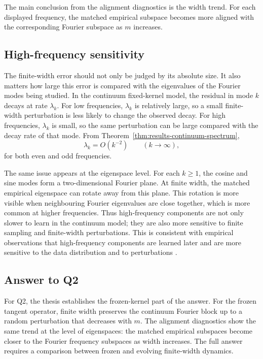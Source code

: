 The main conclusion from the alignment diagnostics is the width trend. For each
displayed frequency, the matched empirical subspace becomes more aligned with
the corresponding Fourier subspace as \(m\) increases.

\subsection{High-frequency sensitivity}
\label{subsec:discussion-q2-relative}

The finite-width error should not only be judged by its absolute size. It also
matters how large this error is compared with the eigenvalues of the Fourier
modes being studied. In the continuum fixed-kernel model, the residual in mode
\(k\) decays at rate \(\lambda_k\). For low frequencies, \(\lambda_k\) is
relatively large, so a small finite-width perturbation is less likely to change
the observed decay. For high frequencies, \(\lambda_k\) is small, so the same
perturbation can be large compared with the decay rate of that mode. From
Theorem~\ref{thm:results-continuum-spectrum},
\[
	\lambda_k = O(k^{-2})
	\qquad (k\to\infty),
\]
for both even and odd frequencies.

The same issue appears at the eigenspace level. For each \(k\ge 1\), the cosine
and sine modes form a two-dimensional Fourier plane. At finite width, the
matched empirical eigenspace can rotate away from this plane. This rotation is
more visible when neighbouring Fourier eigenvalues are close together, which is
more common at higher frequencies. Thus high-frequency components are not only
slower to learn in the continuum model; they are also more sensitive to finite
sampling and finite-width perturbations. This is consistent with empirical
observations that high-frequency components are learned later and are more
sensitive to the data distribution and to perturbations
\citep{rahaman2019spectralbiasneuralnetworks,basri2019convergence,basri2020frequencybiasneuralnetworks}.

\subsection{Answer to Q2}
\label{subsec:discussion-answer-q2}

For Q2, the thesis establishes the frozen-kernel part of the answer. For the
frozen tangent operator, finite width preserves the continuum Fourier block up
to a random perturbation that decreases with \(m\). The alignment diagnostics
show the same trend at the level of eigenspaces: the matched empirical
subspaces become closer to the Fourier frequency subspaces as width increases.
The full answer requires a comparison between frozen and evolving finite-width
dynamics.


